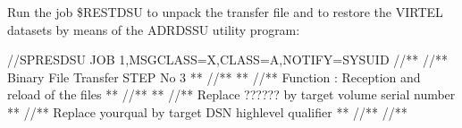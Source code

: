 \documentclass[letterpaper,10pt,english]{sphinxmanual}
\begin{document}
Run the job \$RESTDSU to unpack the transfer file and to restore the VIRTEL datasets by means of the ADRDSSU utility program:

\begin{sphinxVerbatim}[commandchars=\\\{\}]
//SPRESDSU JOB 1,MSGCLASS=X,CLASS=A,NOTIFY=\PYGZam{}SYSUID
//\PYGZbs{}*\PYGZhy{}\PYGZhy{}\PYGZhy{}\PYGZhy{}\PYGZhy{}\PYGZhy{}\PYGZhy{}\PYGZhy{}\PYGZhy{}\PYGZhy{}\PYGZhy{}\PYGZhy{}\PYGZhy{}\PYGZhy{}\PYGZhy{}\PYGZhy{}\PYGZhy{}\PYGZhy{}\PYGZhy{}\PYGZhy{}\PYGZhy{}\PYGZhy{}\PYGZhy{}\PYGZhy{}\PYGZhy{}\PYGZhy{}\PYGZhy{}\PYGZhy{}\PYGZhy{}\PYGZhy{}\PYGZhy{}\PYGZhy{}\PYGZhy{}\PYGZhy{}\PYGZhy{}\PYGZhy{}\PYGZhy{}\PYGZhy{}\PYGZhy{}\PYGZhy{}\PYGZhy{}\PYGZhy{}\PYGZhy{}\PYGZhy{}\PYGZhy{}\PYGZhy{}\PYGZhy{}\PYGZhy{}\PYGZhy{}\PYGZhy{}\PYGZhy{}\PYGZhy{}\PYGZhy{}\PYGZhy{}\PYGZhy{}\PYGZhy{}\PYGZhy{}\PYGZhy{}\PYGZhy{}\PYGZhy{}\PYGZhy{}\PYGZhy{}\PYGZhy{}\PYGZhy{}\PYGZhy{}\PYGZhy{}\PYGZhy{}\PYGZbs{}*
//\PYGZbs{}*\PYGZhy{}\PYGZhy{}\PYGZbs{}* Binary File Transfer \PYGZhy{} STEP No 3 \PYGZbs{}*\PYGZhy{}\PYGZhy{}\PYGZbs{}*
//\PYGZbs{}*\PYGZhy{}\PYGZhy{}\PYGZbs{}* \PYGZbs{}*\PYGZhy{}\PYGZhy{}\PYGZbs{}*
//\PYGZbs{}*\PYGZhy{}\PYGZhy{}\PYGZbs{}* Function : Reception and reload of the files \PYGZbs{}*\PYGZhy{}\PYGZhy{}\PYGZbs{}*
//\PYGZbs{}*\PYGZhy{}\PYGZhy{}\PYGZbs{}* \PYGZbs{}*\PYGZhy{}\PYGZhy{}\PYGZbs{}*
//\PYGZbs{}*\PYGZhy{}\PYGZhy{}\PYGZbs{}* Replace \PYGZsq{}??????\PYGZsq{} by target volume serial number \PYGZbs{}*\PYGZhy{}\PYGZhy{}\PYGZbs{}*
//\PYGZbs{}*\PYGZhy{}\PYGZhy{}\PYGZbs{}* Replace \PYGZsq{}yourqual\PYGZsq{} by target DSN high\PYGZhy{}level qualifier
\PYGZbs{}*\PYGZhy{}\PYGZhy{}\PYGZbs{}*
//\PYGZbs{}*\PYGZhy{}\PYGZhy{}\PYGZhy{}\PYGZhy{}\PYGZhy{}\PYGZhy{}\PYGZhy{}\PYGZhy{}\PYGZhy{}\PYGZhy{}\PYGZhy{}\PYGZhy{}\PYGZhy{}\PYGZhy{}\PYGZhy{}\PYGZhy{}\PYGZhy{}\PYGZhy{}\PYGZhy{}\PYGZhy{}\PYGZhy{}\PYGZhy{}\PYGZhy{}\PYGZhy{}\PYGZhy{}\PYGZhy{}\PYGZhy{}\PYGZhy{}\PYGZhy{}\PYGZhy{}\PYGZhy{}\PYGZhy{}\PYGZhy{}\PYGZhy{}\PYGZhy{}\PYGZhy{}\PYGZhy{}\PYGZhy{}\PYGZhy{}\PYGZhy{}\PYGZhy{}\PYGZhy{}\PYGZhy{}\PYGZhy{}\PYGZhy{}\PYGZhy{}\PYGZhy{}\PYGZhy{}\PYGZhy{}\PYGZhy{}\PYGZhy{}\PYGZhy{}\PYGZhy{}\PYGZhy{}\PYGZhy{}\PYGZhy{}\PYGZhy{}\PYGZhy{}\PYGZhy{}\PYGZhy{}\PYGZhy{}\PYGZhy{}\PYGZhy{}\PYGZhy{}\PYGZhy{}\PYGZhy{}\PYGZhy{}\PYGZbs{}*
//\PYGZbs{}*\PYGZhy{}\PYGZhy{}\PYGZhy{}\PYGZhy{}\PYGZhy{}\PYGZhy{}\PYGZhy{}\PYGZhy{}\PYGZhy{}\PYGZhy{}\PYGZhy{}\PYGZhy{}\PYGZhy{}\PYGZhy{}\PYGZhy{}\PYGZhy{}\PYGZhy{}\PYGZhy{}\PYGZhy{}\PYGZhy{}\PYGZhy{}\PYGZhy{}\PYGZhy{}\PYGZhy{}\PYGZhy{}\PYGZhy{}\PYGZhy{}\PYGZhy{}\PYGZhy{}\PYGZhy{}\PYGZhy{}\PYGZhy{}\PYGZhy{}\PYGZhy{}\PYGZhy{}\PYGZhy{}\PYGZhy{}\PYGZhy{}\PYGZhy{}\PYGZhy{}\PYGZhy{}\PYGZhy{}\PYGZhy{}\PYGZhy{}\PYGZhy{}\PYGZhy{}\PYGZhy{}\PYGZhy{}\PYGZhy{}\PYGZhy{}\PYGZhy{}\PYGZhy{}\PYGZhy{}\PYGZhy{}\PYGZhy{}\PYGZhy{}\PYGZhy{}\PYGZhy{}\PYGZhy{}\PYGZhy{}\PYGZhy{}\PYGZhy{}\PYGZhy{}\PYGZhy{}\PYGZhy{}\PYGZhy{}\PYGZhy{}\PYGZbs{}*

\end{sphinxVerbatim}
\end{document}
